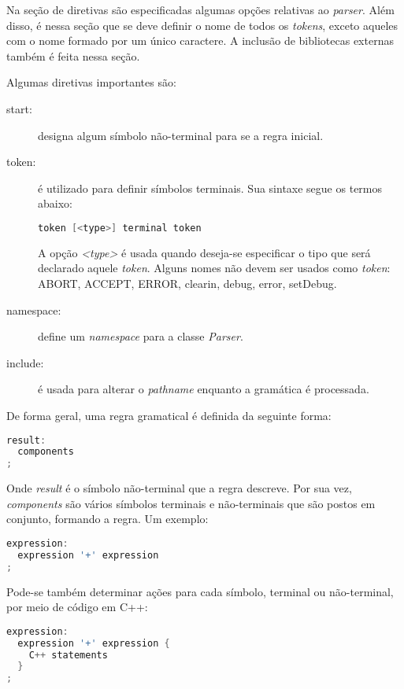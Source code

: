 \begin{apendicesenv}
Na seção de diretivas são especificadas algumas opções relativas ao \textit{parser}. Além disso, é nessa seção que se deve definir o nome de todos os \textit{tokens}, exceto aqueles com o nome formado por um único caractere. A inclusão de bibliotecas externas também é feita nessa seção.

\par
\indent Algumas diretivas importantes são:

\begin{description}
\item[start:] designa algum símbolo não-terminal para se a regra inicial.
\item[token:] é utilizado para definir símbolos terminais. Sua sintaxe segue os termos abaixo:

\begin{lstlisting}[language=c,  caption=Sintaxe]
token [<type>] terminal token
\end{lstlisting}
A opção \textit{<type>} é usada quando deseja-se especificar o tipo que será declarado aquele \textit{token}. Alguns nomes não devem ser usados como \textit{token}: ABORT, ACCEPT, ERROR, clearin, debug, error, setDebug.
\item[namespace:] define um \textit{namespace} para a classe \textit{Parser}.
\item[include:] é usada para alterar o \textit{pathname} enquanto a gramática é processada.
\end{description}

De forma geral, uma regra gramatical é definida da seguinte forma:

\begin{lstlisting}[language=c,  caption=Definição de Regra Gramatical]
result:
  components
;
\end{lstlisting}

\par
\indent Onde \textit{result} é o símbolo não-terminal que a regra descreve. Por sua vez,  \textit{components} são vários símbolos terminais e não-terminais que são postos em conjunto, formando a regra. Um exemplo:
\begin{lstlisting}[language=c,  caption=Exemplo de Regra Gramatical]
expression:
  expression '+' expression
;
\end{lstlisting}

\par 
\indent Pode-se também determinar ações para cada símbolo, terminal ou não-terminal, por meio de código em C++:
\begin{lstlisting}[language=c,  caption=Exemplo de Regra Gramatical Utilizando C++]
expression:
  expression '+' expression {
    C++ statements
  }
;
\end{lstlisting}


\end{apendicesenv}
